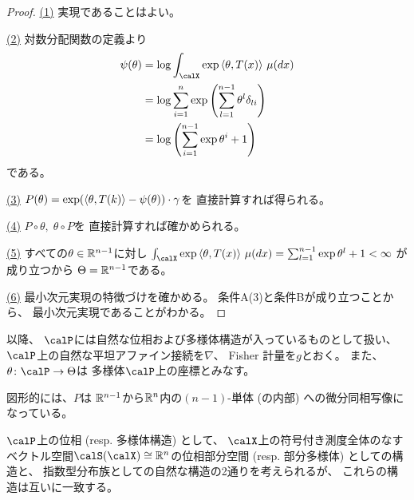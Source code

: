 \documentclass[report]{jlreq}
\begin{document}
\begin{proof}
    \uline{(1)} \quad
    実現であることはよい。

    \uline{(2)} \quad
    対数分配関数の定義より
    \begin{alignat}{1}
        \psi(\theta)
            &=
                \log \int_\calX
                    \exp \myangle{\theta}{T(x)}
                    \, \mu(dx)
                \\
            &=
                \log \sum_{i = 1}^n
                    \exp \myparen{
                        \sum_{l = 1}^{n - 1}
                            \theta^l
                            \delta_{li}
                    }
                \\
            &=
                \log \myparen{
                    \sum_{i = 1}^{n - 1}
                        \exp \theta^i
                    + 1
                }
    \end{alignat}
    である。

    \uline{(3)} \quad
    $P(\theta) = \exp(\left\langle{\theta},{T(k)}\right\rangle - \psi(\theta)) \cdot \gamma$を
    直接計算すれば得られる。

    \uline{(4)} \quad
    $P \circ \theta, \; \theta \circ P$を
    直接計算すれば確かめられる。

    \uline{(5)} \quad
    すべての$\theta \in \mathbb{R}^{n - 1}$に対し
    $\int_\calX \exp \myangle{\theta}{T(x)} \, \mu(dx)
        = \sum_{l = 1}^{n - 1} \exp \theta^l + 1
        < \infty$
    が成り立つから
    $\Theta = \mathbb{R}^{n - 1}$である。

    \uline{(6)} \quad
    最小次元実現の特徴づけを確かめる。
    条件A(3)と条件Bが成り立つことから、
    最小次元実現であることがわかる。
\end{proof}

以降、
$\calP$には自然な位相および多様体構造が入っているものとして扱い、
$\calP$上の自然な平坦アファイン接続を$\nabla$、
Fisher 計量を$g$とおく。
また、$\theta \colon \calP \to \Theta$は
多様体$\calP$上の座標とみなす。

図形的には、$P$は
$\mathbb{R}^{n - 1}$から$\mathbb{R}^n$内の$(n - 1)$-単体 (の内部) への微分同相写像になっている。

\begin{proposition}
    $\calP$上の位相 (resp. 多様体構造) として、
    $\calX$上の符号付き測度全体のなす
    ベクトル空間$\calS(\calX) \cong \R^n$の位相部分空間 (resp. 部分多様体) としての構造と、
    指数型分布族としての自然な構造の2通りを考えられるが、
    これらの構造は互いに一致する。
\end{proposition}
\end{document}

